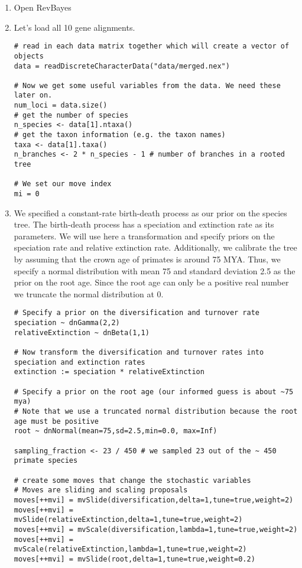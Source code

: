 \begin{enumerate}
\item Open RevBayes
\item Let's load all 10 gene alignments.
{\tt \begin{snugshade*}
\begin{lstlisting}
# read in each data matrix together which will create a vector of objects
data = readDiscreteCharacterData("data/merged.nex")

# Now we get some useful variables from the data. We need these later on.
num_loci = data.size()
# get the number of species
n_species <- data[1].ntaxa()
# get the taxon information (e.g. the taxon names)
taxa <- data[1].taxa()
n_branches <- 2 * n_species - 1 # number of branches in a rooted tree

# We set our move index
mi = 0
\end{lstlisting}
\end{snugshade*}}
\item We specified a constant-rate birth-death process as our prior on the species tree. 
The birth-death process has a speciation and extinction rate as its parameters. 
We will use here a transformation and specify priors on the speciation rate and relative extinction rate.
Additionally, we calibrate the tree by assuming that the crown age of primates is around 75 MYA.
Thus, we specify a normal distribution with mean 75 and standard deviation 2.5 as the prior on the root age.
Since the root age can only be a positive real number we truncate the normal distribution at 0.
{\tt \begin{snugshade*}
\begin{lstlisting}
# Specify a prior on the diversification and turnover rate
speciation ~ dnGamma(2,2)
relativeExtinction ~ dnBeta(1,1)

# Now transform the diversification and turnover rates into speciation and extinction rates
extinction := speciation * relativeExtinction

# Specify a prior on the root age (our informed guess is about ~75 mya)
# Note that we use a truncated normal distribution because the root age must be positive
root ~ dnNormal(mean=75,sd=2.5,min=0.0, max=Inf)

sampling_fraction <- 23 / 450 # we sampled 23 out of the ~ 450 primate species

# create some moves that change the stochastic variables
# Moves are sliding and scaling proposals
moves[++mvi] = mvSlide(diversification,delta=1,tune=true,weight=2)
moves[++mvi] = mvSlide(relativeExtinction,delta=1,tune=true,weight=2)
moves[++mvi] = mvScale(diversification,lambda=1,tune=true,weight=2)
moves[++mvi] = mvScale(relativeExtinction,lambda=1,tune=true,weight=2)
moves[++mvi] = mvSlide(root,delta=1,tune=true,weight=0.2)



\end{lstlisting}
\end{snugshade*}}
\end{enumerate}
